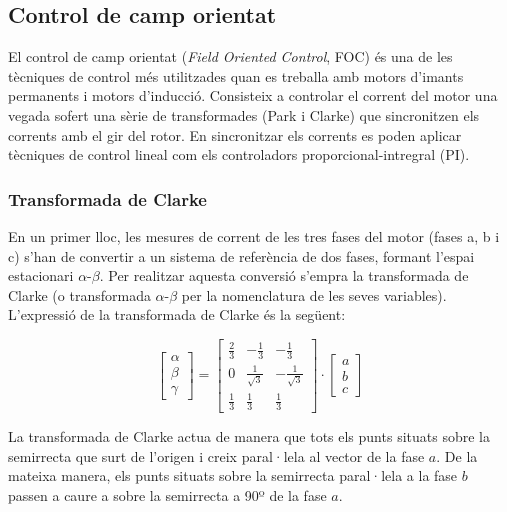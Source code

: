 \subsection{ Control de camp orientat }
{
    El control de camp orientat (\emph{Field Oriented Control}, FOC) és una de
    les tècniques de control més utilitzades quan es treballa amb motors
    d'imants permanents i motors d'inducció. Consisteix a controlar el corrent
    del motor una vegada sofert una sèrie de transformades (Park i Clarke) que
    sincronitzen els corrents amb el gir del rotor. En sincronitzar els
    corrents es poden aplicar tècniques de control lineal com els controladors
    proporcional-intregral (PI).

    \subsubsection{ Transformada de Clarke }
    {
        En un primer lloc, les mesures de corrent de les tres fases del motor
        (fases a, b i c) s'han de convertir a un sistema de referència de dos
        fases, formant l'espai estacionari $\alpha$-$\beta$. Per realitzar
        aquesta conversió s'empra la transformada de Clarke (o transformada
        $\alpha$-$\beta$ per la nomenclatura de les seves variables).
        L'expressió de la transformada de Clarke és la següent:

        \begin{equation}
            \begin{bmatrix} \alpha \\[5pt] \beta \\[5pt] \gamma \end{bmatrix} =
            \begin{bmatrix}
                \frac{2}{3} & -\frac{1}{3} & -\frac{1}{3} \\[5pt]
                0 & \frac{1}{\sqrt{3}} & -\frac{1}{\sqrt{3}} \\[5pt]
                \frac{1}{3} & \frac{1}{3} & \frac{1}{3}
            \end{bmatrix}
            \cdot \begin{bmatrix} a \\[5pt] b \\[5pt] c\end{bmatrix}
        \end{equation}

        La transformada de Clarke actua de manera que tots els punts situats
        sobre la semirrecta que surt de l'origen i creix paral·lela al vector
        de la fase $a$. De la mateixa manera, els punts situats sobre la
        semirrecta paral·lela a la fase $b$ passen a caure a sobre la
        semirrecta a 90º de la fase $a$.

}}
